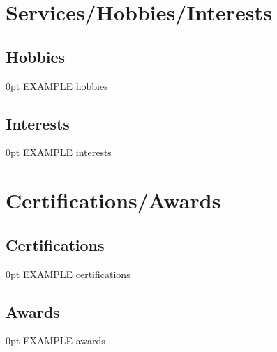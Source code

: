 \documentclass[a4paper,11pt]{article}
\newlength{\myindent}
\begin{document}
\section{ Services/Hobbies/Interests}
    \subsection{Hobbies}
        \begin{addmargin}[\myindent]{0pt}
            EXAMPLE hobbies
        \end{addmargin}
        \vspace{-.8em}
    \subsection{Interests}
        \begin{addmargin}[\myindent]{0pt}
            EXAMPLE interests
        \end{addmargin}
        \vspace{-.25em}

\section{ Certifications/Awards}
    \subsection{Certifications}
        \begin{addmargin}[\myindent]{0pt}
            EXAMPLE certifications
        \end{addmargin}
        \vspace{-.8em}
    \subsection{Awards}
        \begin{addmargin}[\myindent]{0pt}
            EXAMPLE awards
        \end{addmargin}
        \vspace{-.25em}
\end{document}
